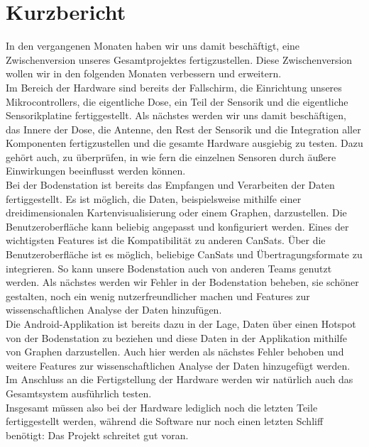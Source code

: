 \section{Kurzbericht}
In den vergangenen Monaten haben wir uns damit beschäftigt, eine Zwischenversion unseres Gesamtprojektes fertigzustellen. Diese Zwischenversion wollen wir in den folgenden Monaten verbessern und erweitern.\\ 
Im Bereich der Hardware sind bereits der Fallschirm, die Einrichtung unseres Mikrocontrollers, die eigentliche Dose, ein Teil der Sensorik und die eigentliche Sensorikplatine fertiggestellt. Als nächstes werden wir uns damit beschäftigen, das Innere der Dose, die Antenne, den Rest der Sensorik und die Integration aller Komponenten fertigzustellen und die gesamte Hardware ausgiebig zu testen. Dazu gehört auch, zu überprüfen, in wie fern die einzelnen Sensoren durch äußere Einwirkungen beeinflusst werden können.\\
Bei der Bodenstation ist bereits das Empfangen und Verarbeiten der Daten fertiggestellt. Es ist möglich, die Daten, beispielsweise mithilfe einer dreidimensionalen Kartenvisualisierung oder einem Graphen, darzustellen. Die Benutzeroberfläche kann beliebig angepasst und konfiguriert werden. Eines der wichtigsten Features ist die Kompatibilität zu anderen CanSats. Über die Benutzeroberfläche ist es möglich, beliebige CanSats und Übertragungsformate zu integrieren. So kann unsere Bodenstation auch von anderen Teams genutzt werden. Als nächstes werden wir Fehler in der Bodenstation beheben, sie schöner gestalten, noch ein wenig nutzerfreundlicher machen und Features zur wissenschaftlichen Analyse der Daten hinzufügen. \\
Die Android-Applikation ist bereits dazu in der Lage, Daten über einen Hotspot von der Bodenstation zu beziehen und diese Daten in der Applikation mithilfe von Graphen darzustellen. Auch hier werden als nächstes Fehler behoben und weitere Features zur wissenschaftlichen Analyse der Daten hinzugefügt werden. \\
Im Anschluss an die Fertigstellung der Hardware werden wir natürlich auch das Gesamtsystem ausführlich testen. \\
Insgesamt müssen also bei der Hardware lediglich noch die letzten Teile fertiggestellt werden, während die Software nur noch einen letzten Schliff benötigt: Das Projekt schreitet gut voran.